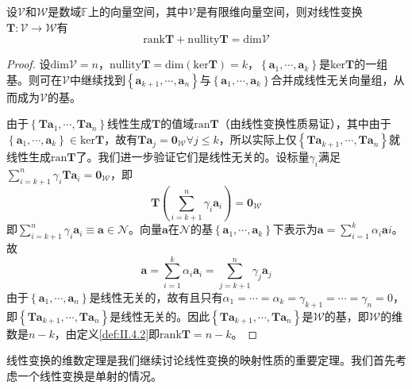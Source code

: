 \documentclass[main.tex]{subfiles}
\begin{document}
\begin{theorem}[秩--零化度定理]\label{thm:II.4.3}
设$\mathcal{V}$和$\mathcal{W}$是数域$\mathbb{F}$上的向量空间，其中$\mathcal{V}$是有限维向量空间，则对线性变换$\mathbf{T}:\mathcal{V}\rightarrow\mathcal{W}$有
\[
\mathrm{rank}\mathbf{T}+\mathrm{nullity}\mathbf{T}=\mathrm{dim}\mathcal{V}
\]
\end{theorem}
\begin{proof}
设$\mathrm{dim}\mathcal{V}=n$，$\mathrm{nullity}\mathbf{T}=\mathrm{dim}\left(\mathrm{ker}\mathbf{T}\right)=k$，$\left\{\mathbf{a}_1,\cdots,\mathbf{a}_k\right\}$是$\mathrm{ker}\mathbf{T}$的一组基。则可在$\mathcal{V}$中继续找到$\left\{\mathbf{a}_{k+1},\cdots,\mathbf{a}_{n}\right\}$与$\left\{\mathbf{a}_1,\cdots,\mathbf{a}_k\right\}$合并成线性无关向量组，从而成为$\mathcal{V}$的基。

由于$\left\{\mathbf{Ta}_1,\cdots,\mathbf{Ta}_n\right\}$线性生成$\mathbf{T}$的值域$\mathrm{ran}\mathbf{T}$（由线性变换性质易证），其中由于$\left\{\mathbf{a}_1,\cdots,\mathbf{a}_k\right\}\in\mathrm{ker}\mathbf{T}$，故有$\mathbf{Ta}_j=\mathbf{0}_\mathcal{W}\forall j\leq k$，所以实际上仅$\left\{\mathbf{Ta}_{k+1},\cdots,\mathbf{Ta}_n\right\}$就线性生成$\mathrm{ran}\mathbf{T}$了。我们进一步验证它们是线性无关的。设标量$\gamma_i$满足$\sum_{i=k+1}^n\gamma_i\mathbf{Ta}_i=\mathbf{0}_\mathcal{W}$，即
\[\mathbf{T}\left(\sum_{i=k+1}^n\gamma_i\mathbf{a}_i\right)=\mathbf{0}_\mathcal{W}\]
即$\sum_{i=k+1}^n\gamma_i\mathbf{a}_i\equiv\mathbf{a}\in\mathcal{N}$。向量$\mathbf{a}$在$\mathcal{N}$的基$\left\{\mathbf{a}_1,\cdots,\mathbf{a}_k\right\}$下表示为$\mathbf{a}=\sum_{i=1}^k\alpha_i\mathbf{a}i$。故
\[
\mathbf{a}=\sum_{i=1}^k\alpha_i\mathbf{a}_i=\sum_{j=k+1}^n\gamma_j\mathbf{a}_j
\]
由于$\left\{\mathbf{a}_1,\cdots,\mathbf{a}_n\right\}$是线性无关的，故有且只有$\alpha_1=\cdots=\alpha_k=\gamma_{k+1}=\cdots=\gamma_n=0$，即$\left\{\mathbf{Ta}_{k+1},\cdots,\mathbf{Ta}_n\right\}$是线性无关的。因此$\left\{\mathbf{Ta}_{k+1},\cdots,\mathbf{Ta}_n\right\}$是$\mathcal{W}$的基，即$\mathcal{W}$的维数是$n-k$，由定义\ref{def:II.4.2}即$\mathrm{rank}\mathbf{T}=n-k$。
\end{proof}

线性变换的维数定理是我们继续讨论线性变换的映射性质的重要定理。我们首先考虑一个线性变换是单射的情况。
\end{document}
